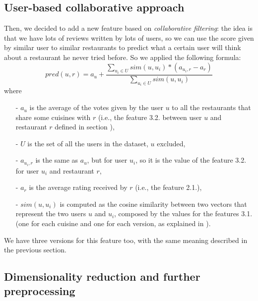 \subsection{User-based collaborative approach}\label{sec:coll-appr}

Then, we decided to add a new feature based on \textit{collaborative filtering}: the idea is that we have lots of reviews written by lots of users, so we can use the score given by similar user to similar restaurants to predict what a certain user will think about a restaurant he never tried before.
So we applied the following formula:
\begin{equation}
    pred(u, r) = a_u + \frac{\sum_{u_i \in U} sim(u, u_i) * \left( a_{u_i, r} - a_r \right)} {\sum_{u_i \in U} sim(u, u_i)}
\end{equation}
where
\begin{itemize}
	\item[-] $a_u$ is the average of the votes given by the user $u$ to all the restaurants that share some cuisines with $r$ (i.e., the feature 3.2. between user $u$ and restaurant $r$ defined in section ),
	\item[-] $U$ is the set of all the users in the dataset, $u$ excluded,
	\item[-] $a_{u_i, r}$ is the same as $a_u$, but for user $u_i$, so it is the value of the feature 3.2. for user $u_i$ and restaurant $r$,
	\item[-] $a_r$ is the average rating received by $r$ (i.e., the feature 2.1.),
	\item[-] $sim(u, u_i)$ is computed as the cosine similarity between two vectors that represent the two users $u$ and $u_i$, composed by the values for the features 3.1. (one for each cuisine and one for each version, as explained in ).
\end{itemize}

We have three versions for this feature too, with the same meaning described in the previous section.

\subsection{Dimensionality reduction and further preprocessing}

